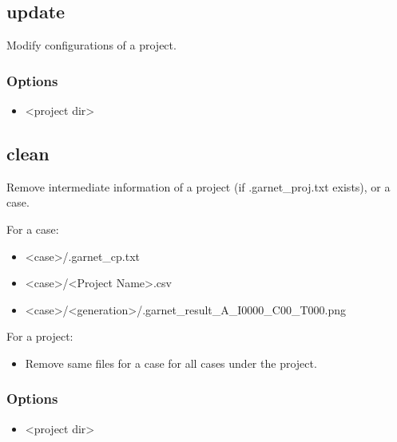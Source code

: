 \documentclass[]{article}
\begin{document}
\subsection{update}\label{update}

Modify configurations of a project.

\subsubsection{Options}\label{options-3}

\begin{itemize}
\itemsep1pt\parskip0pt
\item
  \textless{}project dir\textgreater{}
\end{itemize}

\subsection{clean}\label{clean}

Remove intermediate information of a project (if .garnet\_proj.txt
exists), or a case.

For a case:

\begin{itemize}
\itemsep1pt\parskip0pt
\item
  \textless{}case\textgreater{}/.garnet\_cp.txt
\item
  \textless{}case\textgreater{}/\textless{}Project
  Name\textgreater{}.csv
\item
  \textless{}case\textgreater{}/\textless{}generation\textgreater{}/.garnet\_result\_A\_I0000\_C00\_T000.png
\end{itemize}

For a project:

\begin{itemize}
\itemsep1pt\parskip0pt
\item
  Remove same files for a case for all cases under the project.
\end{itemize}

\subsubsection{Options}\label{options-4}

\begin{itemize}
\itemsep1pt\parskip0pt
\item
  \textless{}project dir\textgreater{}
\end{itemize}
\end{document}
